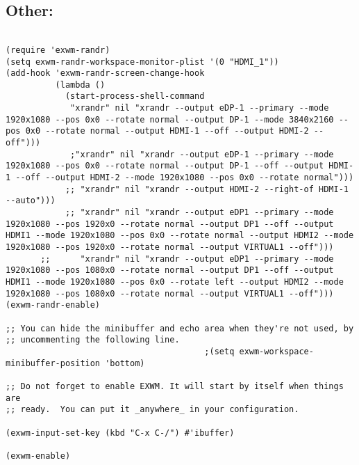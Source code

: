 \documentclass[11pt]{article}
\begin{document}
\subsection{Other:}
\label{sec:orga1e37ca}
\begin{verbatim}

(require 'exwm-randr)
(setq exwm-randr-workspace-monitor-plist '(0 "HDMI_1"))
(add-hook 'exwm-randr-screen-change-hook
          (lambda ()
            (start-process-shell-command
             "xrandr" nil "xrandr --output eDP-1 --primary --mode 1920x1080 --pos 0x0 --rotate normal --output DP-1 --mode 3840x2160 --pos 0x0 --rotate normal --output HDMI-1 --off --output HDMI-2 --off")))
             ;"xrandr" nil "xrandr --output eDP-1 --primary --mode 1920x1080 --pos 0x0 --rotate normal --output DP-1 --off --output HDMI-1 --off --output HDMI-2 --mode 1920x1080 --pos 0x0 --rotate normal")))
            ;; "xrandr" nil "xrandr --output HDMI-2 --right-of HDMI-1 --auto")))
            ;; "xrandr" nil "xrandr --output eDP1 --primary --mode 1920x1080 --pos 1920x0 --rotate normal --output DP1 --off --output HDMI1 --mode 1920x1080 --pos 0x0 --rotate normal --output HDMI2 --mode 1920x1080 --pos 1920x0 --rotate normal --output VIRTUAL1 --off")))
       ;;      "xrandr" nil "xrandr --output eDP1 --primary --mode 1920x1080 --pos 1080x0 --rotate normal --output DP1 --off --output HDMI1 --mode 1920x1080 --pos 0x0 --rotate left --output HDMI2 --mode 1920x1080 --pos 1080x0 --rotate normal --output VIRTUAL1 --off")))
(exwm-randr-enable)

;; You can hide the minibuffer and echo area when they're not used, by
;; uncommenting the following line.
                                        ;(setq exwm-workspace-minibuffer-position 'bottom)

;; Do not forget to enable EXWM. It will start by itself when things are
;; ready.  You can put it _anywhere_ in your configuration.

(exwm-input-set-key (kbd "C-x C-/") #'ibuffer)

(exwm-enable)

\end{verbatim}
\end{document}
